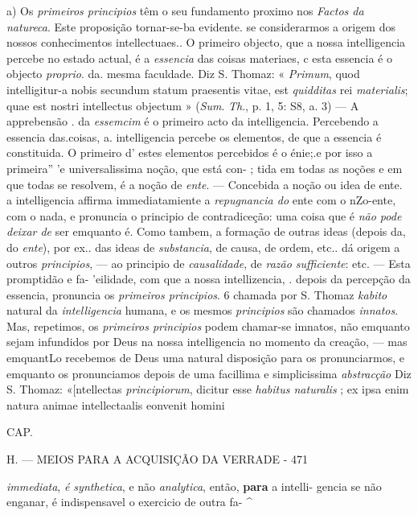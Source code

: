 a) Os \emph{primeiros principios} têm o seu fundamento proximo nos \emph{Factos da natureca}. Este proposição tornar-se-ba evidente. se considerarmos a origem dos nossos conhecimentos intellectuaes.. O primeiro objecto, que a nossa intelligencia percebe no estado actual, é a \emph{essencia} das coisas materiaes, c esta essencia é o objecto \emph{proprio}. da. mesma faculdade. Diz S. Thomaz: « \emph{Primum}, quod intelligitur-a nobis secundum statum praesentis vitae, est \emph{quidditas} rei \emph{materialis}; quae est nostri intellectus objectum » (\emph{Sum}. \emph{Th}., p. 1, 5: S8, a. 3) --- A apprebensão . da \emph{essemcim} é o primeiro acto da intelligencia. Percebendo a essencia das.coisas, a. intelligencia percebe os elementos, de que a essencia é constituida. O primeiro d' estes elementos percebidos é o énie;.e por isso a primeira” 'e universalissima noção, que está con- ; tida em todas as noções e em que todas se resolvem, é a noção de \emph{ente}. --- Concebida a noção ou idea de ente. a intelligencia affirma immediatamiente a \emph{repugnancia do} ente com o nZo-ente, com o nada, e pronuncia o principio de contradiceção: uma coisa que é \emph{não pode deixar de} ser emquanto é. Como tambem, a formação de outras ideas (depois da, do \emph{ente}), por ex.. das ideas de \emph{substancia}, de causa, de ordem, etc.. dá origem a outros \emph{principios}, --- ao principio de \emph{causalidade}, de \emph{razão sufficiente}: etc. --- Esta promptidão e fa- 'eilidade, com que a nossa intellizencia, . depois da percepção da essencia, pronuncia os \emph{primeiros principios}. 6 chamada por S. Thomaz \emph{kabito} natural da \emph{intelligencia} humana, e os mesmos \emph{principios} são chamados \emph{innatos}. Mas, repetimos, os \emph{primeiros principios} podem chamar-se imnatos, não emquanto sejam infundidos por Deus na nossa intelligencia no momento da creação, --- mas emquantLo recebemos de Deus uma natural disposição para os pronunciarmos, e emquanto os pronunciamos depois de uma facillima e simplicissima \emph{abstracção} Diz S. Thomaz: «[ntellectas \emph{principiorum}, dicitur esse \emph{habitus naturalis} ; ex ipsa enim natura animae intellectaalis eonvenit homini

CAP.

H. --- MEIOS PARA A ACQUISIÇÃO DA VERRADE - 471

\emph{immediata}, \emph{é synthetica}, e não \emph{analytica}, então, \textbf{para} a intelli- gencia se não enganar, é indispensavel o exercicio de outra fa- \textasciicircum{}

